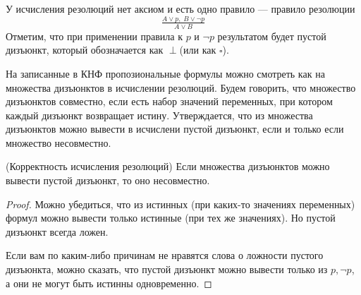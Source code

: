 \documentclass{article}
\begin{document}
У исчисления резолюций нет аксиом и есть одно правило --- правило резолюции
\[\tfrac{A \lor p, \; B \lor \lnot p}{A \lor B} \]
Отметим, что при применении правила к $p$ и $\lnot p$ результатом будет пустой дизъюнкт, который обозначается как $\perp$(или как $\square$).

На записанные в КНФ пропозиональные формулы можно смотреть как на множества дизъюнктов в исчислении резолюций. Будем говорить, что множество дизъюнктов совместно, если есть набор значений переменных, при котором каждый дизъюнкт возвращает истину. Утверждается, что из множества дизъюнктов можно вывести в исчислени пустой дизъюнкт, если и только если множество несовместно.

\begin{theorem}{(Корректность исчисления резолюций)}
	Если множества дизъюнктов можно вывести пустой дизъюнкт, то оно несовместно.
\end{theorem}
\begin{proof}
	Можно убедиться, что из истинных (при каких-то значениях переменных) формул можно вывести только истинные (при тех же значениях). Но пустой дизъюнкт всегда ложен.

	Если вам по каким-либо причинам не нравятся слова о ложности пустого дизъюнкта, можно сказать, что пустой дизъюнкт можно вывести только из $p, \lnot p$, а они не могут быть истинны одновременно.
\end{proof}
\end{document}
